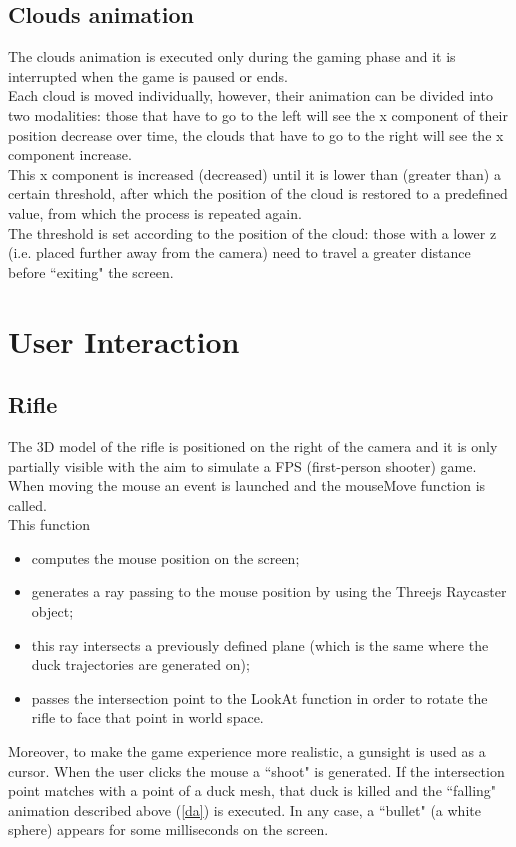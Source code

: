 \documentclass[12pt,a4paper]{article}
\begin{document}
	\subsection{Clouds animation}
	The clouds animation is executed only during the gaming phase and it is interrupted when the game is paused or ends.\\
	Each cloud is moved individually, however, their animation can be divided into two modalities: those that have to go to the left will see the x component of their position decrease over time, the clouds that have to go to the right will see the x component increase.\\
	This x component is increased (decreased) until it is lower than (greater than) a certain threshold, after which the position of the cloud is restored to a predefined value, from which the process is repeated again.\\
	The threshold is set according to the position of the cloud: those with a lower z (i.e. placed further away from the camera) need to travel a greater distance before ``exiting" the screen.
	
	
	\section{User Interaction} \label{user}
	\subsection{Rifle}
	The 3D model of the rifle is positioned on the right of the camera and it is only partially visible with the aim to simulate a FPS (first-person shooter) game.
	When moving the mouse an event is launched and the mouseMove function is called.\\
	This function
	\begin{itemize}
		\item computes the mouse position on the screen;
		\item generates a ray passing to the mouse position by using the Threejs Raycaster object;
		\item this ray intersects a previously defined plane (which is the same where the duck trajectories are generated on);
		\item passes the intersection point to the LookAt function in order to rotate the rifle to face that point in world space.
	\end{itemize}
	Moreover, to make the game experience more realistic, a gunsight is used as a cursor. 
	When the user clicks the mouse a ``shoot" is generated. If the intersection point matches with a point of a duck mesh, that duck is killed and the ``falling" animation described above (\ref{da}) is executed. In any case, a ``bullet" (a white sphere) appears for some milliseconds on the screen.
	
\end{document}
